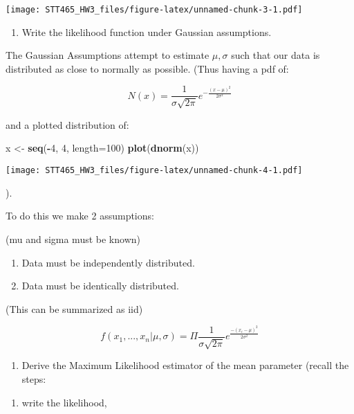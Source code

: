 \documentclass[]{article}
\newenvironment{Shaded}{\begin{snugshade}}{\end{snugshade}}
\newcommand{\KeywordTok}[1]{\textcolor[rgb]{0.13,0.29,0.53}{\textbf{#1}}}
\newcommand{\DataTypeTok}[1]{\textcolor[rgb]{0.13,0.29,0.53}{#1}}
\newcommand{\DecValTok}[1]{\textcolor[rgb]{0.00,0.00,0.81}{#1}}
\newcommand{\StringTok}[1]{\textcolor[rgb]{0.31,0.60,0.02}{#1}}
\newcommand{\OperatorTok}[1]{\textcolor[rgb]{0.81,0.36,0.00}{\textbf{#1}}}
\newcommand{\NormalTok}[1]{#1}
\providecommand{\tightlist}{%
  \setlength{\itemsep}{0pt}\setlength{\parskip}{0pt}}
\begin{document}
\texttt{[image: STT465\_HW3\_files/figure-latex/unnamed-chunk-3-1.pdf]}

\begin{enumerate}
\def\labelenumi{\alph{enumi})}
\setcounter{enumi}{1}
\tightlist
\item
  Write the likelihood function under Gaussian assumptions.
\end{enumerate}

The Gaussian Assumptions attempt to estimate \(\mu , \sigma\) such that
our data is distributed as close to normally as possible. (Thus having a
pdf of:

\[ N(x)=\frac{1}{\sigma \sqrt{2 \pi}} e^{-\frac{(x-\mu)^{2}}{2 \sigma^{2}}} \]

and a plotted distribution of:

\begin{Shaded}
\begin{Highlighting}[]
\NormalTok{x <-}\StringTok{ }\KeywordTok{seq}\NormalTok{(}\OperatorTok{-}\DecValTok{4}\NormalTok{, }\DecValTok{4}\NormalTok{, }\DataTypeTok{length=}\DecValTok{100}\NormalTok{)}
\KeywordTok{plot}\NormalTok{(}\KeywordTok{dnorm}\NormalTok{(x))}
\end{Highlighting}
\end{Shaded}

\texttt{[image: STT465\_HW3\_files/figure-latex/unnamed-chunk-4-1.pdf]}

).

To do this we make 2 assumptions:

(mu and sigma must be known)

\begin{enumerate}
\def\labelenumi{\arabic{enumi}.}
\tightlist
\item
  Data must be independently distributed.
\item
  Data must be identically distributed.
\end{enumerate}

(This can be summarized as iid)

\[ f(x_1 , ...,x_n|\mu , \sigma) = \Pi \frac{1}{\sigma \sqrt{2\pi}} e^{\frac{-(x_i -\mu)^2}{2\sigma^2}} \]

\begin{enumerate}
\def\labelenumi{\alph{enumi})}
\setcounter{enumi}{2}
\tightlist
\item
  Derive the Maximum Likelihood estimator of the mean parameter (recall
  the steps:
\end{enumerate}

\begin{enumerate}
\def\labelenumi{\arabic{enumi}.}
\tightlist
\item
  write the likelihood,
\end{enumerate}
\end{document}

